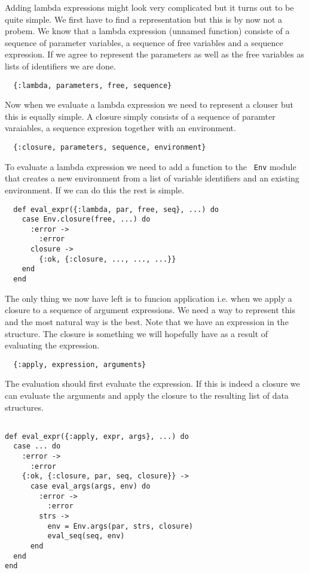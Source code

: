 \documentclass[a4paper,11pt]{article}
\begin{document}
Adding lambda expressions might look very complicated but it turns out
to be quite simple. We first have to find a representation but this is
by now not a probem. We know that a lambda expression (unnamed
function) consiste of a sequence of parameter variables, a sequence of
free variables and a sequence expression. If we agree to represent the
parameters as well as the free variables as lists of identifiers we
are done.

\begin{verbatim}
  {:lambda, parameters, free, sequence}
\end{verbatim}

Now when we evaluate a lambda expression we need to represent a
clouser but this is equally simple. A closure simply consists of a
sequence of paramter varaiables, a sequence expresion together with an
environment.

\begin{verbatim}
  {:closure, parameters, sequence, environment}
\end{verbatim}

To evaluate a lambda expression we need to add a function to the {\tt
  Env} module that creates a new environment from a list of variable
identifiers and an existing environment. If we can do this the rest is
simple.

\begin{verbatim}
  def eval_expr({:lambda, par, free, seq}, ...) do
    case Env.closure(free, ...) do
      :error ->
        :error
      closure ->
        {:ok, {:closure, ..., ..., ...}}
    end
  end
\end{verbatim}

The only thing we now have left is to funcion application i.e. when we
apply a closure to a sequence of argument expressions. We need a way
to represent this and the most natural way is the best. Note that we
have an expression in the structure. The closure is something we will
hopefully have as a result of evaluating the expression. 

\begin{verbatim}
  {:apply, expression, arguments}
\end{verbatim}

The evaluation should first evaluate the expression. If this is indeed
a closure we can evaluate the arguments and apply the closure to the
resulting list of data structures.

\begin{verbatim}

def eval_expr({:apply, expr, args}, ...) do
  case ... do 
    :error ->
      :error
    {:ok, {:closure, par, seq, closure}} ->
      case eval_args(args, env) do
        :error ->
          :error
        strs ->
          env = Env.args(par, strs, closure)
          eval_seq(seq, env)
      end
  end
end
\end{verbatim}
\end{document}
